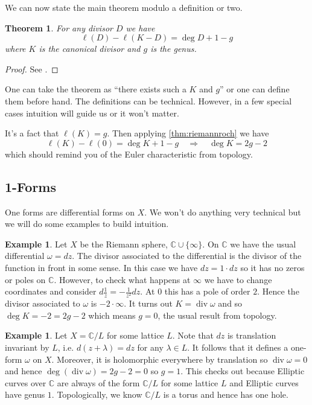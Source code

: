 \documentclass[11pt]{article}
\newcommand{\BB}[1]{\mathbb{#1}} %
\newcommand{\CC}{\BB{C}}
\renewcommand{\div}{\operatorname{div}} %
\theoremstyle{plain}
\newtheorem{thm}[theoremCounter]{Theorem}
\theoremstyle{definition}
\newtheorem{ex}[exampleCounter]{Example}
\theoremstyle{remark}
\begin{document}
We can now state the main theorem modulo a definition or two.

\begin{thm}\label{thm:riemannroch}
	For any divisor $D$ we have
	$$
	\ell(D) - \ell(K-D) = \deg D + 1 - g
	$$
	where $K$ is the \emph{canonical divisor} and $g$ is the \emph{genus}.
\end{thm}
\begin{proof}
	See \cite{hartshorne1977algebraic}.
\end{proof}

One can take the theorem as ``there exists such a $K$ and $g$'' or one can define them before hand. The definitions can be technical. However, in a few special cases intuition will guide us or it won't matter.

It's a fact that $\ell(K) = g$. Then applying \autoref{thm:riemannroch} we have
$$
\ell(K) - \ell(0) = \deg K + 1 - g
\quad\Rightarrow\quad
\deg K = 2g - 2
$$
which should remind you of the Euler characteristic from topology.

\subsection{1-Forms}

One forms are differential forms on $X$. We won't do anything very technical but we will do some examples to build intuition.

\begin{ex}
	Let $X$ be the Riemann sphere, $\CC\cup\{\infty\}$. On $\CC$ we have the usual differential $\omega = dz$. The divisor associated to the differential is the divisor of the function in front in some sense. In this case we have $dz = 1\cdot dz$ so it has no zeros or poles on $\CC$. However, to check what happens at $\infty$ we have to change coordinates and consider $d\frac{1}{z} = -\frac{1}{z^2}dz$. At $0$ this has a pole of order $2$. Hence the divisor associated to $\omega$ is $-2\cdot\infty$. It turns out $K = \div\omega$ and so $\deg K = -2 = 2g-2$ which means $g=0$, the usual result from topology.
\end{ex}

\begin{ex}
	Let $X = \CC/L$ for some lattice $L$. Note that $dz$ is translation invariant by $L$, i.e. $d(z+\lambda) = dz$ for any $\lambda\in L$. It follows that it defines a one-form $\omega$ on $X$. Moreover, it is holomorphic everywhere by translation so $\div\omega = 0$ and hence $\deg(\div \omega) = 2g - 2 = 0$ so $g = 1$. This checks out because Elliptic curves over $\CC$ are always of the form $\CC/L$ for some lattice $L$ and Elliptic curves have genus $1$. Topologically, we know $\CC/L$ is a torus and hence has one hole.
\end{ex}
\end{document}

